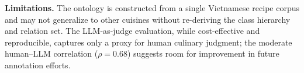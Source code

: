 
\textbf{Limitations.}
The ontology is constructed from a single Vietnamese recipe corpus and may not generalize to other cuisines without re-deriving the class hierarchy and relation set. The LLM-as-judge evaluation, while cost-effective and reproducible, captures only a proxy for human culinary judgment; the moderate human--LLM correlation ($\rho = 0.68$) suggests room for improvement in future annotation efforts.